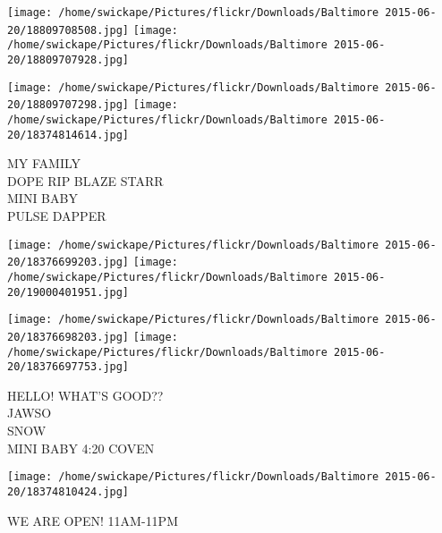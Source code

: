 \documentclass[10pt,letterpaper]{article}
\begin{document}
\texttt{[image: /home/swickape/Pictures/flickr/Downloads/Baltimore 2015-06-20/18809708508.jpg]}
\texttt{[image: /home/swickape/Pictures/flickr/Downloads/Baltimore 2015-06-20/18809707928.jpg]}

\texttt{[image: /home/swickape/Pictures/flickr/Downloads/Baltimore 2015-06-20/18809707298.jpg]}
\texttt{[image: /home/swickape/Pictures/flickr/Downloads/Baltimore 2015-06-20/18374814614.jpg]}

MY FAMILY\\
DOPE RIP BLAZE STARR\\
MINI BABY\\
PULSE DAPPER
\pagebreak

\texttt{[image: /home/swickape/Pictures/flickr/Downloads/Baltimore 2015-06-20/18376699203.jpg]}
\texttt{[image: /home/swickape/Pictures/flickr/Downloads/Baltimore 2015-06-20/19000401951.jpg]}

\texttt{[image: /home/swickape/Pictures/flickr/Downloads/Baltimore 2015-06-20/18376698203.jpg]}
\texttt{[image: /home/swickape/Pictures/flickr/Downloads/Baltimore 2015-06-20/18376697753.jpg]}

HELLO!  WHAT'S GOOD??\\
JAWSO\\
SNOW\\
MINI BABY 4:20 COVEN
\pagebreak

\texttt{[image: /home/swickape/Pictures/flickr/Downloads/Baltimore 2015-06-20/18374810424.jpg]}

WE ARE OPEN!  11AM{-}11PM
\pagebreak
\end{document}
